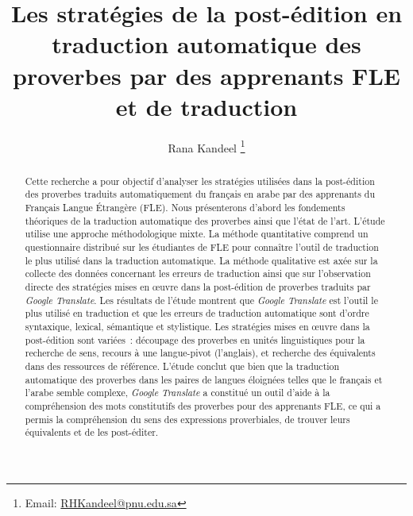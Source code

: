 \documentclass[french]{textolivre}
\title{Les stratégies de la post-édition en traduction automatique des proverbes par des apprenants FLE et de traduction}
\author[1]{Rana Kandeel \orcid{0000-0002-8523-4169} \thanks{Email: \url{RHKandeel@pnu.edu.sa}}}
\affil[1]{Princess Nourah Bint Abdulrahman University, College of Languages, Translation Department, Riyadh, Saudi-Arabia.}
\begin{document}
\maketitle

\begin{polyabstract}
\begin{abstract}
Cette recherche a pour objectif d’analyser les stratégies utilisées dans la post-édition des proverbes traduits automatiquement du français en arabe par des apprenants du Français Langue Étrangère (FLE). Nous présenterons d’abord les fondements théoriques de la traduction automatique des proverbes ainsi que l’état de l’art. L’étude utilise une approche méthodologique mixte. La méthode quantitative comprend un questionnaire distribué sur les étudiantes de FLE pour connaître l’outil de traduction le plus utilisé dans la traduction automatique. La méthode qualitative est axée sur la collecte des données concernant les erreurs de traduction ainsi que sur l’observation directe des stratégies mises en œuvre dans la post-édition de proverbes traduits par \textit{Google Translate}. Les résultats de l’étude montrent que \textit{Google Translate} est l’outil le plus utilisé en traduction et que les erreurs de traduction automatique sont d’ordre syntaxique, lexical, sémantique et stylistique. Les stratégies mises en œuvre dans la post-édition sont variées : découpage des proverbes en unités linguistiques pour la recherche de sens, recours à une langue-pivot (l’anglais), et recherche des équivalents dans des ressources de référence. L’étude conclut que bien que la traduction automatique des proverbes dans les paires de langues éloignées telles que le français et l’arabe semble complexe, \textit{Google Translate} a constitué un outil d’aide à la compréhension des mots constitutifs des proverbes pour des apprenants FLE, ce qui a permis la compréhension du sens des expressions proverbiales, de trouver leurs équivalents et de les post-éditer.

\end{abstract}


\end{polyabstract}
\end{document}
